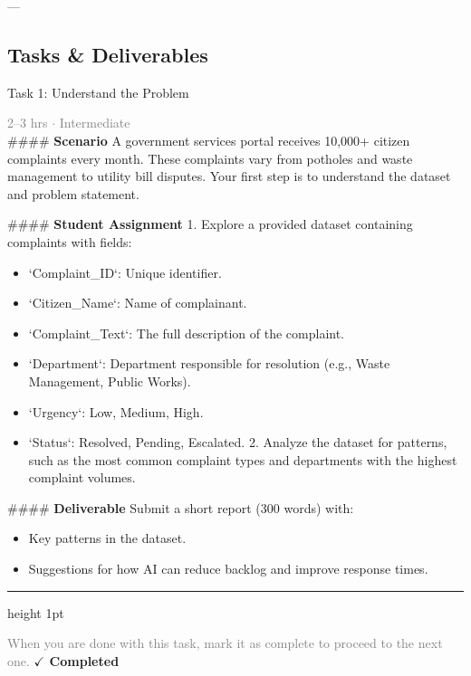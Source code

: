\documentclass[10pt,a4paper]{article}
\begin{document}
---

\subsection*{Tasks \& Deliverables}

\begin{taskbox}{Task 1: Understand the Problem}

    {\small \textcolor{gray}{2--3 hrs $\cdot$ Intermediate}}\\[12pt]

    \#\#\#\# \textbf{Scenario}  
A government services portal receives 10,000+ citizen complaints every month. These complaints vary from potholes and waste management to utility bill disputes. Your first step is to understand the dataset and problem statement.  

\#\#\#\# \textbf{Student Assignment}  
1. Explore a provided dataset containing complaints with fields:  
\begin{itemize}
    \item `Complaint\_ID`: Unique identifier.  
    \item `Citizen\_Name`: Name of complainant.  
    \item `Complaint\_Text`: The full description of the complaint.  
    \item `Department`: Department responsible for resolution (e.g., Waste Management, Public Works).  
    \item `Urgency`: Low, Medium, High.  
    \item `Status`: Resolved, Pending, Escalated.  
2. Analyze the dataset for patterns, such as the most common complaint types and departments with the highest complaint volumes.  
\end{itemize}

\#\#\#\# \textbf{Deliverable}  
Submit a short report (300 words) with:  
\begin{itemize}
    \item Key patterns in the dataset.  
    \item Suggestions for how AI can reduce backlog and improve response times.\par
\end{itemize}

    \vspace{16pt}

    \textcolor{cardBorder}{\hrule height 1pt}\vspace{8pt}

    \small \textcolor{gray}{When you are done with this task, mark it as complete to proceed to the next one.} \hfill \textbf{\textcolor{brandDark}{$\checkmark$ Completed}}

\end{taskbox}
\end{document}
